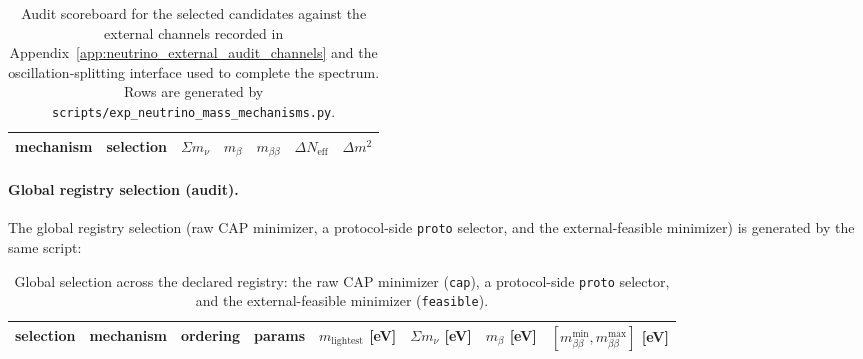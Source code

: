 \begin{table}[t]
\centering
\scriptsize
\setlength{\tabcolsep}{6pt}
\renewcommand{\arraystretch}{1.15}
\begin{tabular}{lllllll}
\toprule
mechanism & selection &
$\Sigma m_\nu$ & $m_\beta$ & $m_{\beta\beta}$ & $\Delta N_\mathrm{eff}$ & $\Delta m^2$ \\
\midrule
%
\end{tabular}
\caption{Audit scoreboard for the selected candidates against the external channels recorded in Appendix~\ref{app:neutrino_external_audit_channels} and the oscillation-splitting interface used to complete the spectrum. Rows are generated by \texttt{scripts/exp\_neutrino\_mass\_mechanisms.py}.}
\label{tab:neutrino_mechanism_scoreboard}
\end{table}

\paragraph{Global registry selection (audit).}
\AuditTag The global registry selection (raw CAP minimizer, a protocol-side \texttt{proto} selector, and the external-feasible minimizer) is generated by the same script:
%

\begin{table}[t]
\centering
\scriptsize
\setlength{\tabcolsep}{5pt}
\renewcommand{\arraystretch}{1.15}
\begin{tabular}{llllrrrr}
\toprule
selection & mechanism & ordering & params &
$m_{\mathrm{lightest}}$ [eV] & $\Sigma m_\nu$ [eV] & $m_\beta$ [eV] & $[m_{\beta\beta}^{\min},m_{\beta\beta}^{\max}]$ [eV] \\
\midrule
%
\end{tabular}
\caption{Global selection across the declared registry: the raw CAP minimizer (\texttt{cap}), a protocol-side \texttt{proto} selector, and the external-feasible minimizer (\texttt{feasible}).}
\label{tab:neutrino_mechanism_global}
\end{table}
